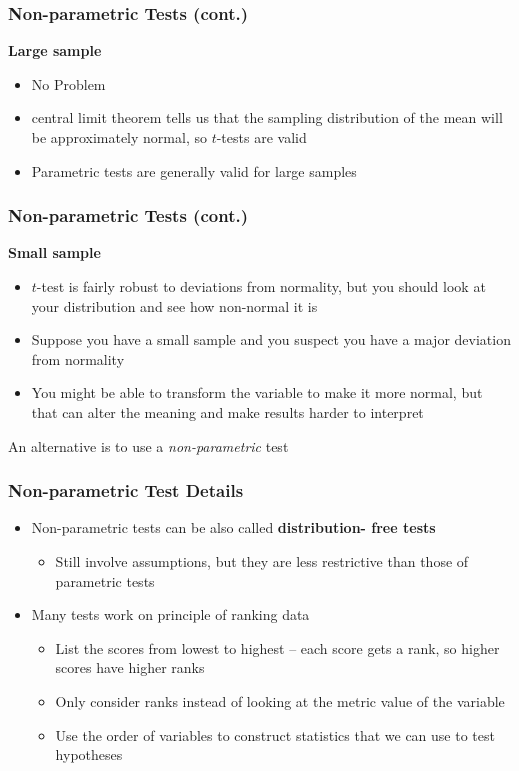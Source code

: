 \documentclass[12pt, block=fill]{beamer}
\begin{document}
\begin{frame}
  \frametitle{Non-parametric Tests (cont.)}    

  \textbf{Large sample} 
  \begin{itemize}
    \item No Problem
    \item central limit theorem tells us that the sampling distribution of the mean will be approximately normal, so $t$-tests are valid
    \item Parametric tests are generally valid for large samples
  \end{itemize}

\end{frame}


\begin{frame}
  \frametitle{Non-parametric Tests (cont.)}
  
  \textbf{Small sample}
  \begin{itemize}
    \item $t$-test is fairly robust to deviations from normality, but you should look at your distribution and see how non-normal it is
    \item Suppose you have a small sample and you suspect you have a major deviation from normality
    \item You might be able to transform the variable to make it more normal, but that can alter the meaning and make results harder to interpret
  \end{itemize}
  
  
  \begin{exampleblock}{An alternative is to use a \textit{non-parametric} test}
    
  \end{exampleblock}
  
    
\end{frame}

\begin{frame}
  \frametitle{Non-parametric Test Details}
  
  \begin{itemize}
      \item Non-parametric tests can be also called \textbf{distribution- free tests}
      \begin{itemize}
          \item Still involve assumptions, but they are less restrictive than those of parametric tests
      \end{itemize}
      \item Many tests work on principle of ranking data
      \begin{itemize}
          \item List the scores from lowest to highest -- each score gets a rank, so higher scores have higher ranks
          \item Only consider ranks instead of looking at the metric value of the variable
          \item Use the order of variables to construct statistics that we can use to test hypotheses
      \end{itemize}
  \end{itemize}
    
\end{frame}
\end{document}
